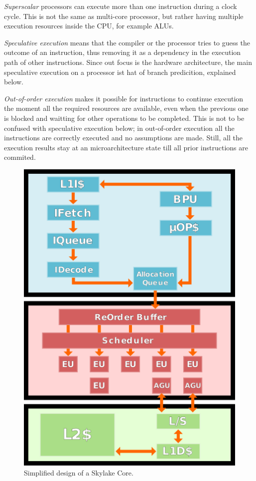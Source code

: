 \documentclass[sigconf]{acmart}
\begin{document}
{\itshape Superscalar} processors can execute more than one instruction during a clock cycle. This is not the same as multi-core processor, but rather having multiple execution resources inside the CPU, for example ALUs. 

{\itshape Speculative execution} means that the compiler or the processor tries to guess the outcome of an instruction, thus removing it as a dependency in the execution path of other instructions. Since out focus is the hardware architecture, the main speculative execution on a processor ist hat of branch predicition, explained below. 

{\itshape Out-of-order execution} makes it possible for instructions to continue execution the moment all the required resources are available, even when the previous one is blocked and waitting for other operations to be completed. This is not to be confused with speculative execution below; in out-of-order execution all the instructions are correctly executed and no assumptions are made. Still, all the execution results stay at an microarchitecture state till all prior instructions are commited. 

\begin{figure}[h]
  \centering
  \includegraphics[width=\linewidth]{skylake_simple_diagram}
  \caption{Simplified design of a Skylake Core.}  
\end{figure}
\end{document}
